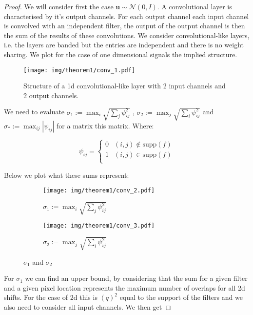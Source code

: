 \documentclass{article} %
\theoremstyle{definition}
\begin{document}
\begin{proof}
We will consider first the case $\boldsymbol{u} \sim \mathcal{N}(0, I)$. A convolutional layer is characterised by it's output channels. For each output channel each input channel is convolved with an independent filter, the output of the output channel is then the sum of the results of these convolutions. We consider convolutional-like layers, i.e. the layers are banded but the entries are independent and there is no weight sharing. We plot for the case of one dimensional signals the implied structure. 


\begin{figure}[h!]
\centering
\texttt{[image: img/theorem1/conv\_1.pdf]}
\caption{Structure of a 1d convolutional-like layer with 2 input channels and 2 output channels.}
\end{figure}  



We need to evaluate $\sigma_1:= \max_i \sqrt{ \sum_j \psi_{ij}^2 }$ , $\sigma_2:= \max_j \sqrt{ \sum_i \psi_{ij}^2 }$ and $\sigma_*:= \max_{ij}|\psi_{ij}|$ for a matrix this matrix. Where:

\begin{equation}
\psi_{ij} = 
\begin{cases} 
      0 & (i,j)\notin \text{supp}(f) \\
      1 & (i,j)\in \text{supp}(f) \\
\end{cases}
\end{equation}

Below we plot what these sums represent:

\begin{figure}[h!]
\centering
\begin{subfigure}{.5\textwidth}
  \centering
  \texttt{[image: img/theorem1/conv\_2.pdf]}
  \caption{$\sigma_1:= \max_i \sqrt{ \sum_j \psi_{ij}^2 }$ }
  \label{fig:sub1}
\end{subfigure}%
\begin{subfigure}{.5\textwidth}
  \centering
  \texttt{[image: img/theorem1/conv\_3.pdf]}
  \caption{$\sigma_2:= \max_j \sqrt{ \sum_i \psi_{ij}^2 }$}
  \label{fig:sub2}
\end{subfigure}
\caption{$\sigma_1$ and $\sigma_2$}
\label{fig:test}
\end{figure}

For $\sigma_1$ we can find an upper bound, by considering that the sum for a given filter and a given pixel location represents the maximum number of overlaps for all 2d shifts. For the case of 2d this is $(q)^2$ equal to the support of the filters and we also need to consider all input channels. We then get 


\end{proof}
\end{document}
